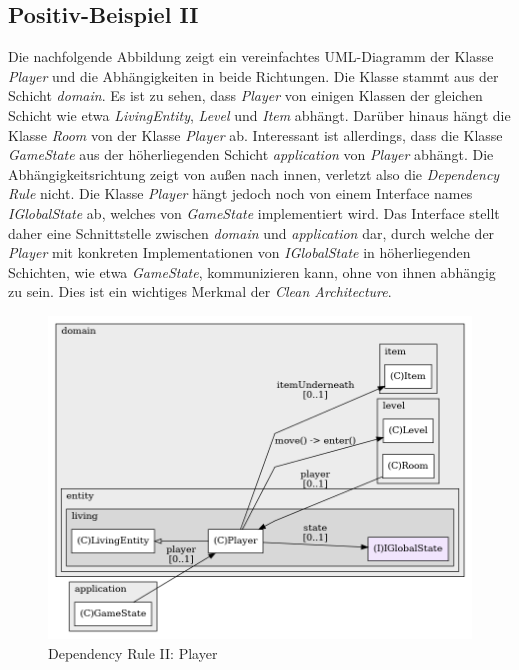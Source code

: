 \subsection*{Positiv-Beispiel II}
Die nachfolgende Abbildung zeigt ein vereinfachtes UML-Diagramm der
Klasse \textit{Player} und die Abhängigkeiten in beide Richtungen.
Die Klasse stammt aus der Schicht \textit{domain}.
Es ist zu sehen, dass \textit{Player} von einigen Klassen der gleichen
Schicht wie etwa \textit{LivingEntity},  \textit{Level} und \textit{Item}
abhängt. Darüber hinaus hängt die Klasse \textit{Room} von der Klasse
\textit{Player} ab. Interessant ist allerdings, dass die Klasse
\textit{GameState} aus der höherliegenden Schicht \textit{application}
von \textit{Player} abhängt. Die Abhängigkeitsrichtung zeigt von 
außen nach innen, verletzt also die \textit{Dependency Rule} nicht.
Die Klasse \textit{Player} hängt jedoch noch von einem Interface
names \textit{IGlobalState} ab, welches von \textit{GameState}
implementiert wird. Das Interface stellt daher eine Schnittstelle
zwischen \textit{domain} und \textit{application} dar, durch welche
der \textit{Player} mit konkreten Implementationen von \textit{IGlobalState}
in höherliegenden Schichten, wie etwa \textit{GameState}, kommunizieren
kann, ohne von ihnen abhängig zu sein. Dies ist ein wichtiges Merkmal
der \textit{Clean Architecture}.

\vspace{0.5cm}
\begin{figure}[H]
    \centering
    \includegraphics[width=0.9\linewidth]{Bilder/Visualisierung/Player_structure.png}
    \caption{Dependency Rule II: Player}
\end{figure}

